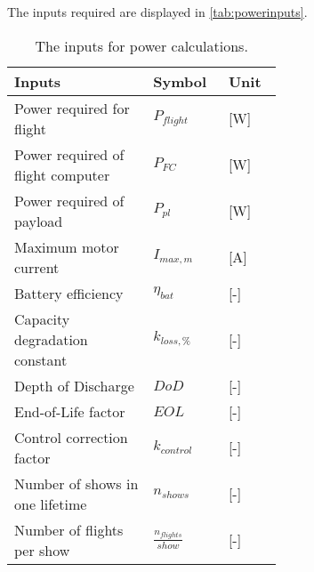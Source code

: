 The inputs required are displayed in \autoref{tab:powerinputs}.
\begin{longtable}{p{0.4\linewidth}p{0.1\linewidth}p{0.1\linewidth}}
\caption{The inputs for power calculations.}
\label{tab:powerinputs}\\
\textbf{Inputs}                   & \textbf{Symbol} & \textbf{Unit} \\ \hline
\endfirsthead
%
\endhead
%
Power required for flight         & $P_{\mathit{flight}}$     & [W]     \\
Power required of flight computer & $P_{\mathit{FC}}$        & [W]       \\
Power required of payload         & $P_{\mathit{pl}}$        & [W]       \\
Maximum motor current             & $I_{\mathit{max, m}}$        & [A]  \\
Battery efficiency                & $\eta_{\mathit{bat}}$       & [-]   \\
Capacity degradation constant     & $k_{\mathit{loss,\%}}$    &  [-]      \\
Depth of Discharge                & $\mathit{DoD}$          & [-]       \\
End-of-Life factor                & $\mathit{EOL}$          & [-]       \\
Control correction factor         & $k_\mathit{control}$    & [-]       \\
Number of shows in one lifetime   & $n_{\mathit{shows}}$    & [-]       \\
Number of flights per show        & $\frac{n_{\mathit{flights}}}{show}$ & [-]
\end{longtable}

